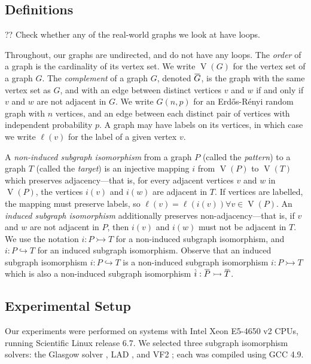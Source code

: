 \documentclass[twoside,11pt]{article}
\newcommand{\citep}[1]{\cite{#1}}
\newcommand{\shortoverline}[1]{\mkern 1.5mu\overline{\mkern-1.5mu#1\mkern-1.5mu}\mkern 1.5mu}
\begin{document}
\subsection{Definitions}

?? Check whether any of the real-world graphs we look at have loops.

Throughout, our graphs are undirected, and do not have any loops.  The \emph{order} of a graph is
the cardinality of its vertex set. We write $\operatorname{V}(G)$ for the vertex set of a graph $G$.
The \emph{complement} of a graph $G$, denoted $\shortoverline{G}$, is the graph with the same vertex
set as $G$, and with an edge between distinct vertices $v$ and $w$ if and only if $v$ and $w$ are
not adjacent in $G$. We write $G(n, p)$ for an Erd\H{o}s-R\'enyi random graph with $n$ vertices, and
an edge between each distinct pair of vertices with independent probability $p$.  A graph may have
labels on its vertices, in which case we write $\ell(v)$ for the label of a given vertex $v$.

A \emph{non-induced subgraph isomorphism} from a graph $P$ (called the \emph{pattern}) to a graph
$T$ (called the \emph{target}) is an injective mapping $i$ from $\operatorname{V}(P)$ to
$\operatorname{V}(T)$ which preserves adjacency---that is, for every adjacent vertices $v$ and $w$
in $\operatorname{V}(P)$, the vertices $i(v)$ and $i(w)$ are adjacent in $T$. If vertices are
labelled, the mapping must preserve labels, so $\ell(v) = \ell(i(v)) \forall v \in
\operatorname{V}(P)$. An \emph{induced subgraph isomorphism} additionally preserves
non-adjacency---that is, if $v$ and $w$ are not adjacent in $P$, then $i(v)$ and $i(w)$ must not be
adjacent in $T$. We use the notation $i : P \rightarrowtail T$ for a non-induced subgraph
isomorphism, and $i : P \hookrightarrow T$ for an induced subgraph isomorphism. Observe that an
induced subgraph isomorphism $i : P \hookrightarrow T$ is a non-induced subgraph isomorphism $i : P
\rightarrowtail T$ which is also a non-induced subgraph isomorphism $\shortoverline{i} :
\shortoverline{P} \rightarrowtail \shortoverline{T}$.

\subsection{Experimental Setup}

Our experiments were performed on systems with Intel Xeon E5-4650 v2 CPUs, running Scientific Linux
release 6.7. We selected three subgraph isomorphism solvers: the Glasgow solver
\citep{McCreesh:2015}, LAD \citep{Solnon:2010}, and VF2 \citep{Cordella:2004}; each was compiled
using GCC 4.9.
\end{document}
